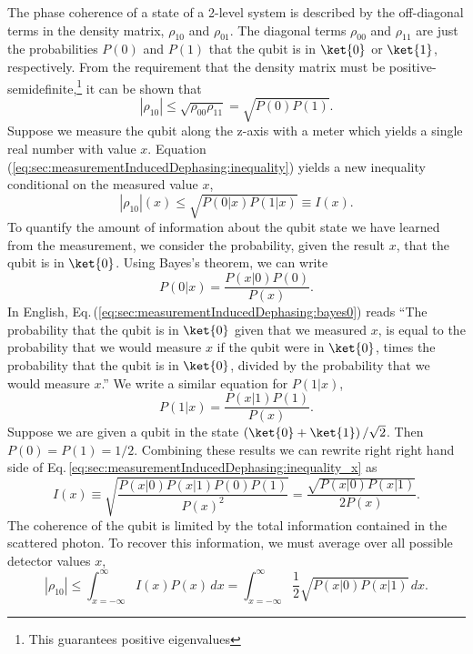 
The phase coherence of a state of a 2-level system is described by the off-diagonal terms in the density matrix, $\rho_{10}$ and $\rho_{01}$.
The diagonal terms $\rho_{00}$ and $\rho_{11}$ are just the probabilities $P(0)$ and $P(1)$ that the qubit is in $\ket{0}$ or $\ket{1}$, respectively.
From the requirement that the density matrix must be positive-semidefinite,\footnote{This guarantees positive eigenvalues} it can be shown that \begin{equation}
\left| \rho_{10} \right| \leq \sqrt{\rho_{00} \rho_{11}} = \sqrt{P(0)P(1)} . \label{eq:sec:measurementInducedDephasing:inequality} \end{equation}
Suppose we measure the qubit along the z-axis with a meter which yields a single real number with value $x$.
Equation (\ref{eq:sec:measurementInducedDephasing:inequality}) yields a new inequality conditional on the measured value $x$, \begin{equation}
\left| \rho_{10} \right|(x) \leq \sqrt{P(0|x) P(1|x)} \equiv I(x) . \label{eq:sec:measurementInducedDephasing:inequality_x} \end{equation}
To quantify the amount of information about the qubit state we have learned from the measurement, we consider the probability, given the result $x$, that the qubit is in $\ket{0}$.
Using Bayes's theorem, we can write \begin{equation}
P(0|x) = \frac{P(x|0)P(0)}{P(x)}. \label{eq:sec:measurementInducedDephasing:bayes0} \end{equation}
In English, Eq.\,(\ref{eq:sec:measurementInducedDephasing:bayes0}) reads ``The probability that the qubit is in $\ket{0}$ given that we measured $x$, is equal to the probability that we would measure $x$ if the qubit were in $\ket{0}$, times the probability that the qubit is in $\ket{0}$, divided by the probability that we would measure $x$.''
We write a similar equation for $P(1|x)$, \begin{equation}
P(1|x) = \frac{P(x|1)P(1)}{P(x)}. \label{eq:sec:measurementInducedDephasing:bayes1} \end{equation}
Suppose we are given a qubit in the state $\left( \ket{0} + \ket{1} \right) / \sqrt{2}$.
Then $P(0)=P(1)=1/2$.
Combining these results we can rewrite right right hand side of Eq.\,\ref{eq:sec:measurementInducedDephasing:inequality_x} as \begin{equation}
I(x) \equiv \sqrt{\frac{P(x|0)P(x|1)P(0)P(1)}{P(x)^2}} = \frac{\sqrt{P(x|0)P(x|1)}}{2 P(x)} . \end{equation}
The coherence of the qubit is limited by the total information contained in the scattered photon.
To recover this information, we must average over all possible detector values $x$, \begin{equation}
\left| \rho_{10} \right| \leq \int_{x = -\infty}^{\infty} I(x) P(x) \, dx = \int_{x = -\infty}^{\infty} \frac{1}{2}\sqrt{P(x|0)P(x|1)}\,dx . \label{eq:sec:measurementInducedDephasing:integralForm} \end{equation}


